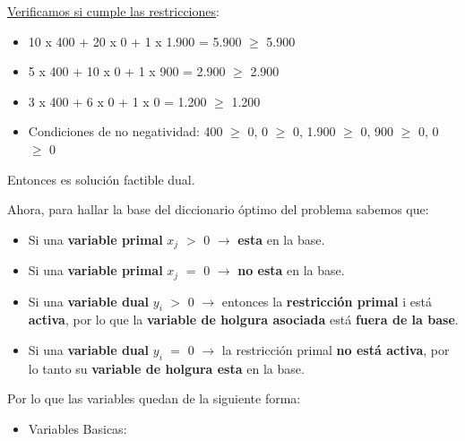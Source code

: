 \documentclass[10pt,a4paper]{article}
\begin{document}
\begin{enumerate}[label=\textbf{\sffamily\large\arabic*.}]
\begin{itemize}
    \end{itemize}

    \underline{Verificamos si cumple las restricciones}:

    \begin{itemize}

        \item 10 x 400 + 20 x 0 + 1 x 1.900 = 5.900 $\geq$ 5.900
        \item 5 x 400 + 10 x 0 + 1 x 900 = 2.900 $\geq$ 2.900
        \item 3 x 400 + 6 x 0 + 1 x 0 = 1.200 $\geq$ 1.200
        \item Condiciones de no negatividad: 400 $\geq$ 0, 0 $\geq$ 0, 1.900 $\geq$ 0, 900 $\geq$ 0, 0 $\geq$ 0\\

    \end{itemize}

    Entonces es solución factible dual.\\

    \clearpage

    Ahora, para hallar la base del diccionario óptimo del problema sabemos que:

    \begin{itemize}

        \item Si una \textbf{variable primal} $x_{j}$ $>$ 0 $\rightarrow$ \textbf{esta} en la base.
        \item Si una \textbf{variable primal} $x_{j}$ $=$ 0 $\rightarrow$ \textbf{no esta} en la base.
        \item Si una \textbf{variable dual} $y_{i}$ $>$ 0 $\rightarrow$  entonces la \textbf{restricción primal} 
        i está \textbf{activa}, por lo que la \textbf{variable de holgura asociada} está \textbf{fuera de la base}.
        \item Si una \textbf{variable dual} $y_{i}$ $=$ 0 $\rightarrow$  la restricción primal \textbf{no está activa}, por lo tanto su \textbf{variable de 
        holgura  esta} en la base. \\

    \end{itemize}

    Por lo que las variables quedan de la siguiente forma:

    \begin{itemize}

        \item Variables Basicas:
        \begin{itemize}


\end{itemize}
\end{itemize}
\end{enumerate}
\end{document}
